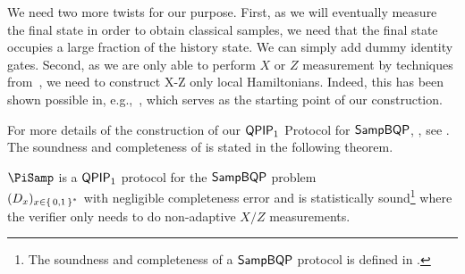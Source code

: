 We need two more twists for our purpose.
First, as we will eventually measure the final state in order to obtain classical samples, we need that the final state occupies a large fraction of the history state. We can simply add dummy identity gates.
Second, as we are only able to perform $X$ or $Z$ measurement by techniques from~\cite{FOCS:Mahadev18a},
we need to construct X-Z only local Hamiltonians.
Indeed, this has been shown possible in, e.g.,~\cite{PhysRevA.78.012352}, which serves as the starting point of our construction.



 For more details of the construction of our $\operatorname{\mathsf{QPIP}}_1$ Protocol for $\operatorname{\mathsf{SampBQP}}$, , see . The soundness and completeness of  is stated in the following theorem.

\begin{thm}
    \label{QPIP1thm}
	$\PiSamp$ is a $\operatorname{\mathsf{QPIP}}_1$ protocol for the $\operatorname{\mathsf{SampBQP}}$ problem\\ $(D_x)_{x\in\set{0,1}^*}$ with negligible completeness error and is statistically sound\footnote{The soundness and completeness of a $\operatorname{\mathsf{SampBQP}}$ protocol is defined in .} where the verifier only needs to do non-adaptive $X/Z$ measurements.
\end{thm}